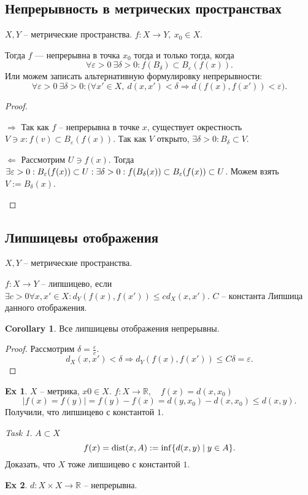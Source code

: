 \documentclass[11pt]{book}
\newcommand{\R}{\mathbb{R}}
\newcommand{\dist}{{\mathop{\text{\rm dist}}}}
\renewcommand{\le}{\leqslant}
\theoremstyle{definition}
\theoremstyle{plain}
\theoremstyle{plain}
\theoremstyle{definition}
\newtheorem*{ex}{Ex}
\newtheorem*{cor}{Corollary}
\theoremstyle{remark}
\newtheorem*{task}{Task}
\begin{document}
\subsection{Непрерывность в метрических пространствах}
\begin{thm}
    $X, Y$ -- метрические пространства.  $f: X \to  Y, ~ x_0 \in  X$.

    Тогда $f$ --- непрерывна в точка $x_0$ тогда и только тогда, когда
    \[
	\forall  \varepsilon >0 ~ \exists  \delta  >0: f(B_{ \delta }) \subset B_{ \varepsilon } (f(x))
    .\]
    Или можем записать альтернативную формулировку непрерывности:
    \[
	\forall  \varepsilon >0 ~\exists \delta >0: \bigl(\forall x' \in  X ,~  d(x, x') < \delta \Longrightarrow   d(f(x) , f(x')) < \varepsilon\bigr)
    .\]
\end{thm}
\begin{proof}
    $ $
    \begin{description}
	\item $ \boxed{ \Longrightarrow }$ Так как $f$ -- непрерывна в точке $x$, существует окрестность $V \ni x: f(v) \subset  B_{ \varepsilon }(f(x))$. Так как $V$ открыто, $\exists  \delta >0 : B_{ \delta } \subset  V$.
	\item $ \boxed{ \Longleftarrow }$ 
     Рассмотрим $U \ni f(x)$.
    Тогда $\exists  \varepsilon >0: B_{ \varepsilon }(f(x)) \subset U: \\
    \exists \delta  >0 : f(B_{\delta}(x)) \subset  B_{ \varepsilon } (f(x)) \subset  U$.
    Можем взять  $V:=B_{ \delta } (x)$.
    \end{description}
\end{proof}
\subsection{Липшицевы отображения}
\begin{defn}
    $X, Y$ -- метрические пространства.

    $f: X \to  Y$ -- липшицево, если $\exists c > 0 \forall  x, x' \in  X: d_Y(f(x), f(x')) \le c d_X(x, x')$. $C$ -- константа Липшица данного отображения.
\end{defn}
\begin{cor}
    Все липшицевы отображения непрерывны.
\end{cor}
\begin{proof}
    Рассмотрим $ \delta = \frac{\varepsilon}{c}$.
    \[
	d_X(x, x') < \delta  \Rightarrow d_Y(f(x), f(x')) \le C \delta = \varepsilon
    .\]
\end{proof}
\begin{ex}
    $X $ -- метрика, $x0 \in  X$.
    $f: X \to  \R, \quad f(x) = d(x, x_0)$
    \[
	|f(x) = f(y)| = f(y) - f(x) = d(y, x_0) - d(x, x_0) \le d(x, y)
    .\]
    Получили, что липшицево с константой $1$.
\end{ex}
\begin{task}
    $A \subset  X$
    \[
	f(x) = \dist(x, A) := \inf \{d(x, y) \mid y \in  A\}
    .\]
    Доказать, что $X$ тоже липшицево с константой $1$.
\end{task}
\begin{ex}
    $d : X \times X \to  \R$ -- непрерывна.
\end{ex}
\end{document}
